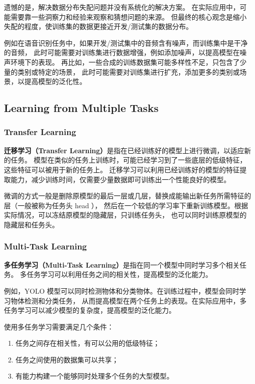 遗憾的是，解决数据分布失配问题并没有系统化的解决方案。
在实际应用中，可能需要靠一些洞察力和经验来观察和猜想问题的来源。
但最终的核心观念是缩小失配的程度，使训练集的数据更接近开发/测试集的数据分布。

例如在语音识别任务中，如果开发/测试集中的音频含有噪声，而训练集中是干净的音频，
此时可能需要对训练集进行数据增强，例如添加噪声，以提高模型在噪声环境下的表现。
再比如，一些合成的训练数据集可能多样性不足，只包含了少量的类别或特定的场景，
此时可能需要对训练集进行扩充，添加更多的类别或场景，以提高模型的泛化性。

\subsection{Learning from Multiple Tasks}

\subsubsection{Transfer Learning}

\textbf{迁移学习（Transfer Learning）}是指在已经训练好的模型上进行微调，以适应新的任务。
模型在类似的任务上训练时，可能已经学习到了一些底层的低级特征，这些特征可以被用于新的任务上。
迁移学习可以利用已经训练好的模型的特征提取能力，减少训练时间，仅需要少量数据即可训练出一个性能良好的模型。

微调的方式一般是删除原模型的最后一层或几层，替换成能输出新任务所需特征的层（一般被称为任务头 head ），
然后在一个较低的学习率下重新训练模型。根据实际情况，可以冻结原模型的隐藏层，只训练任务头，
也可以同时训练原模型的隐藏层和任务头。

\subsubsection{Multi-Task Learning}

\textbf{多任务学习（Multi-Task Learning）}是指在同一个模型中同时学习多个相关任务。
多任务学习可以利用任务之间的相关性，提高模型的泛化能力。

例如，YOLO 模型可以同时检测物体和分类物体。在训练过程中，模型会同时学习物体检测和分类任务，
从而提高模型在两个任务上的表现。在实际应用中，多任务学习可以减少模型的复杂度，提高模型的泛化能力。

使用多任务学习需要满足几个条件：

\begin{enumerate}
    \item 任务之间存在相关性，有可以公用的低级特征；
    \item 任务之间使用的数据集可以共享；
    \item 有能力构建一个能够同时处理多个任务的大型模型。
\end{enumerate}

